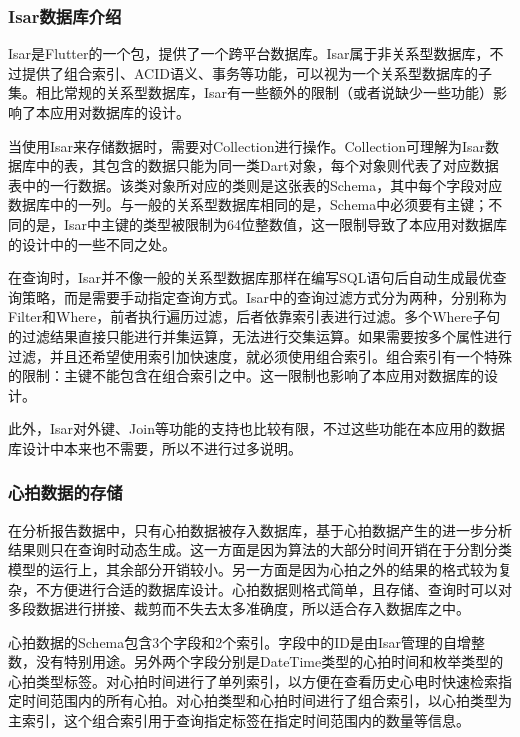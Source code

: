 \subsubsection{Isar数据库介绍}\label{subsubsec:isar-intro}

Isar是Flutter的一个包，提供了一个跨平台数据库。Isar属于非关系型数据库，不过提供了组合索引、ACID语义、事务等功能，可以视为一个关系型数据库的子集。相比常规的关系型数据库，Isar有一些额外的限制（或者说缺少一些功能）影响了本应用对数据库的设计。

当使用Isar来存储数据时，需要对Collection进行操作。Collection可理解为Isar数据库中的表，其包含的数据只能为同一类Dart对象，每个对象则代表了对应数据表中的一行数据。该类对象所对应的类则是这张表的Schema，其中每个字段对应数据库中的一列。与一般的关系型数据库相同的是，Schema中必须要有主键；不同的是，Isar中主键的类型被限制为64位整数值，这一限制导致了本应用对数据库的设计中的一些不同之处。

在查询时，Isar并不像一般的关系型数据库那样在编写SQL语句后自动生成最优查询策略，而是需要手动指定查询方式。Isar中的查询过滤方式分为两种，分别称为Filter和Where，前者执行遍历过滤，后者依靠索引表进行过滤。多个Where子句的过滤结果直接只能进行并集运算，无法进行交集运算。如果需要按多个属性进行过滤，并且还希望使用索引加快速度，就必须使用组合索引。组合索引有一个特殊的限制：主键不能包含在组合索引之中。这一限制也影响了本应用对数据库的设计。

此外，Isar对外键、Join等功能的支持也比较有限，不过这些功能在本应用的数据库设计中本来也不需要，所以不进行过多说明。

\subsubsection{心拍数据的存储}\label{subsubsec:beat-storage}

在分析报告数据中，只有心拍数据被存入数据库，基于心拍数据产生的进一步分析结果则只在查询时动态生成。这一方面是因为算法的大部分时间开销在于分割分类模型的运行上，其余部分开销较小。另一方面是因为心拍之外的结果的格式较为复杂，不方便进行合适的数据库设计。心拍数据则格式简单，且存储、查询时可以对多段数据进行拼接、裁剪而不失去太多准确度，所以适合存入数据库之中。

心拍数据的Schema包含3个字段和2个索引。字段中的ID是由Isar管理的自增整数，没有特别用途。另外两个字段分别是DateTime类型的心拍时间和枚举类型的心拍类型标签。对心拍时间进行了单列索引，以方便在查看历史心电时快速检索指定时间范围内的所有心拍。对心拍类型和心拍时间进行了组合索引，以心拍类型为主索引，这个组合索引用于查询指定标签在指定时间范围内的数量等信息。

